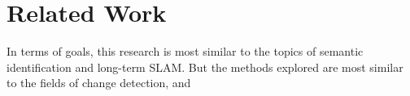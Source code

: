 \section{Related Work}
\label{sec:related_work}

In terms of goals, this research is most similar to the topics of semantic identification and long-term SLAM. But the methods explored are most similar to the fields of change detection, and 

% 